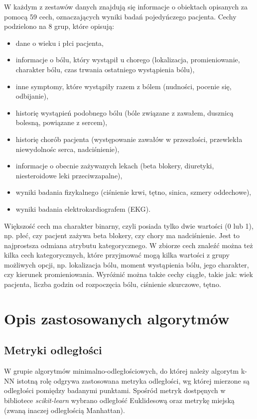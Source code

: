 \documentclass{article}
\begin{document}
\noindent
W każdym z zestawów danych znajdują się informacje o obiektach opisanych za pomocą 59 cech, oznaczających wyniki badań pojedyńczego pacjenta. Cechy podzielono na 8 grup, które opisują:
\begin{itemize}
    \item dane o wieku i płci pacjenta,
    \item informacje o bólu, który wystąpił u chorego (lokalizacja, promieniowanie, charakter bólu, czas trwania ostatniego wystąpienia bólu),
    \item inne symptomy, które wystąpiły razem z bólem (nudności, pocenie się, odbijanie),
    \item historię wystąpień podobnego bólu (bóle związane z zawałem, dusznicą bolesną, powiązane z sercem),
    \item historię chorób pacjenta (występowanie zawałów w przeszłości, przewlekła niewydolnośc serca, nadciśnienie),
    \item informacje o obecnie zażywanych lekach (beta blokery, diuretyki, niesteroidowe leki przeciwzapalne),
    \item wyniki badania fizykalnego (ciśnienie krwi, tętno, sinica, szmery oddechowe),
    \item wyniki badania elektrokardiografem (EKG).
\end{itemize}{}
Większość cech ma charakter binarny, czyli posiada tylko dwie wartości (0 lub 1), np. płeć, czy pacjent zażywa beta blokery, czy chory ma nadciśnienie. Jest to najprostsza odmiana atrybutu kategorycznego. W zbiorze cech znaleźć można też kilka cech kategorycznych, które przyjmować mogą kilka wartości z grupy możliwych opcji, np. lokalizacja bólu, moment wystąpienia bólu, jego charakter, czy kierunek promieniowania. Wyróżnić można także cechy ciągłe, takie jak: wiek pacjenta, liczba godzin od rozpoczęcia bólu, ciśnienie skurczowe, tętno.

\newpage

\section{Opis zastosowanych algorytmów}

\subsection{Metryki odległości}
W grupie algorytmów minimalno-odległościowych, do której należy algorytm k-NN istotną rolę odgrywa zastosowana metryka odległości, wg której mierzone są odległości pomiędzy badanymi punktami. Spośród metryk dostpęnych w bibliotece \textit{scikit-learn} wybrano odległość Euklidesową oraz metrykę miejską (zwaną inaczej odległością Manhattan).
\end{document}

